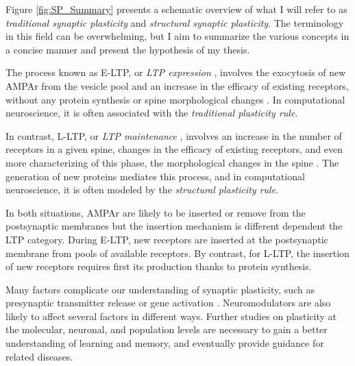 Figure \ref{fig:SP_Summary} presents a schematic overview of what I will refer to as \textit{traditional synaptic plasticity} and \textit{structural synaptic plasticity}. The terminology in this field can be overwhelming, but I aim to summarize the various concepts in a concise manner and present the hypothesis of my thesis.

The process known as \acrfull{E-LTP}, or \textit{LTP expression} \citep{heidelberger_synaptic_2014}, involves the exocytosis of new AMPAr from the vesicle pool and an increase in the efficacy of existing receptors, without any protein synthesis or spine morphological changes \citep{lamprecht_structural_2004}. In computational neuroscience, it is often associated with the \textit{traditional plasticity rule}.

In contrast, \acrfull{L-LTP}, or \textit{LTP maintenance} \citep{heidelberger_synaptic_2014}, involves an increase in the number of receptors in a given spine, changes in the efficacy of existing receptors, and even more characterizing of this phase, the morphological changes in the spine \citep{lamprecht_structural_2004}. The generation of new proteins mediates this process, and in computational neuroscience, it is often modeled by the \textit{structural plasticity rule}.

In both situations, \acrshort{AMPAr} are likely to be inserted or remove from the postsynaptic membranes but the insertion mechanism is different dependent the \acrshort{LTP} category. During \acrshort{E-LTP}, new receptors are inserted at the postsynaptic membrane from pools of available receptors. By contrast, for \acrshort{L-LTP}, the insertion of new receptors requires first its production thanks to protein synthesis. 

Many factors complicate our understanding of synaptic plasticity, such as presynaptic transmitter release or gene activation \citep{baltaci_molecular_2019, citri_synaptic_2008}. Neuromodulators are also likely to affect several factors in different ways. Further studies on plasticity at the molecular, neuronal, and population levels are necessary to gain a better understanding of learning and memory, and eventually provide guidance for related diseases.







